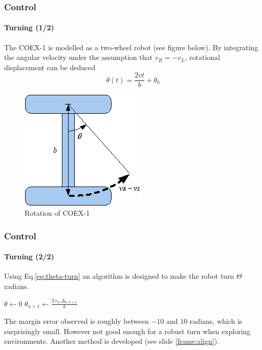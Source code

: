 \documentclass[10pt]{beamer}
\begin{document}

\begin{frame}[label={frame:control-turn}]
\frametitle{Control}
\framesubtitle{Turning (1/2)}
The COEX-1 is modelled as a two-wheel robot (see figure below). By integrating the angular velocity under the assumption that $v_R = -v_L$, rotational displacement can be deduced
\begin{equation}\label{eq:theta-turn}
\theta(t) = \frac{2vt}{b} + \theta_0
\end{equation}
\begin{figure}[hbtp]
\centering
\includegraphics[scale=0.45]{figures/differential-system.jpg}
\caption{Rotation of COEX-1}
\label{fig:model-turn}
\end{figure}
\end{frame}


\begin{frame}
\frametitle{Control}
\framesubtitle{Turning (2/2)}
Using Eq.\ref{eq:theta-turn} an algorithm is designed to make the robot turn $\Theta$ radians.
\vspace*{8mm}
\begin{algorithmic}[1]
\State $\theta\gets 0$
\State {}
\While{$\theta < \Theta$}
\State $\theta_{n+1} \gets \frac{2\, v_n\, \Delta_{n:n+1}}{b}$
\EndWhile
\State {}
\EndProcedure
\end{algorithmic}
\vspace*{8mm}
The margin error observed is roughly between $-10$ and $10$ radians, which is surprisingly small. However not good enough for a robust turn when exploring environments. Another method is developed (see slide \ref{frame:align}).
\end{frame}
\end{document}

